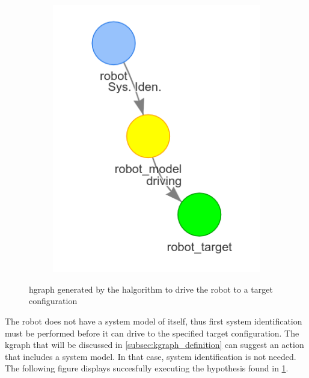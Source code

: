 \begin{figure}[H]
\begin{subfigure}{.3\textwidth}
    \end{subfigure}
    \begin{subfigure}{.3\textwidth}
    \centering
    \includegraphics[width=\textwidth]{figures/connecting_nodes/robot_to_target/robot_iden_drive_target}
    \end{subfigure}
    \caption{\ac{hgraph} generated by the \ac{halgorithm} to drive the robot to a target configuration}%
    \label{fig:robot_drive_hgraph}
\end{figure}

The robot does not have a system model of itself, thus first system identification must be performed before it can drive to the specified target configuration. The \ac{kgraph} that will be discussed in \cref{subsec:kgraph_definition} can suggest an action that includes a system model. In that case, system identification is not needed. The following figure displays succesfully executing the hypothesis found in \cref{fig:robot_drive_hgraph}.\bs

